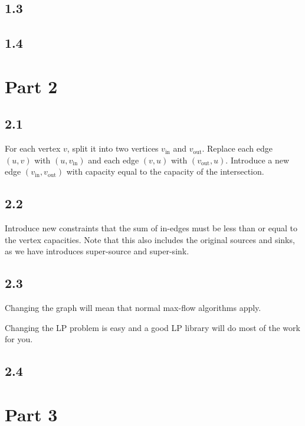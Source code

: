 \documentclass{sig-alternate}
\begin{document}
\subsection{1.3}

\subsection{1.4}



\section{Part 2}
\subsection{2.1}
For each vertex $v$, split it into two vertices $v_{\text{in}}$ and
$v_{\text{out}}$. Replace each edge $(u, v)$ with $(u, v_{\text{in}})$
and each edge $(v, u)$ with $(v_{\text{out}}, u)$. Introduce a new edge
$(v_{\text{in}}, v_{\text{out}})$ with capacity equal to the capacity of
the intersection.

\subsection{2.2}
Introduce new constraints that the sum of in-edges must be less than or equal
to the vertex capacities. Note that this also includes the original sources and
sinks, as we have introduces super-source and super-sink.

\subsection{2.3}
Changing the graph will mean that normal max-flow algorithms apply.

Changing the LP problem is easy and a good LP library will do most of the
work for you.

\subsection{2.4}

\section{Part 3}


\end{document}
